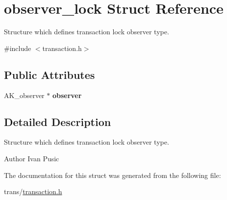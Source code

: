 \hypertarget{structobserver__lock}{}\section{observer\+\_\+lock Struct Reference}
\label{structobserver__lock}


Structure which defines transaction lock observer type.  




{\ttfamily \#include $<$transaction.\+h$>$}

\subsection*{Public Attributes}
\begin{DoxyCompactItemize}
\item 
A\+K\+\_\+observer $\ast$ {\bfseries observer}\hypertarget{structobserver__lock_a50392f80cd7b7915056d44a49013f190}{}\label{structobserver__lock_a50392f80cd7b7915056d44a49013f190}

\end{DoxyCompactItemize}


\subsection{Detailed Description}
Structure which defines transaction lock observer type. 

\begin{DoxyAuthor}{Author}
Ivan Pusic 
\end{DoxyAuthor}


The documentation for this struct was generated from the following file\+:\begin{DoxyCompactItemize}
\item 
trans/\hyperlink{transaction_8h}{transaction.\+h}\end{DoxyCompactItemize}
